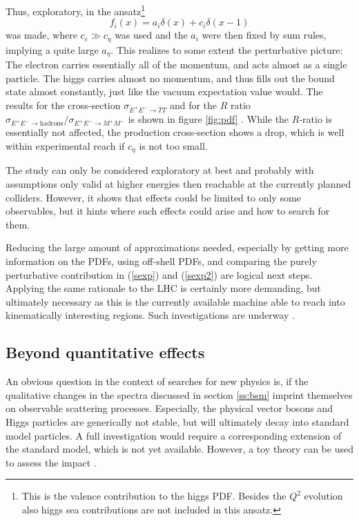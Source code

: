 \documentclass[final,12pt]{article}
\newcommand*{\no}{\noindent}
\newcommand*{\be}{\begin{equation}}
\newcommand*{\ee}{\end{equation}}
\newcommand*{\pref}[1]{(\ref{#1})}
\newcommand*{\1}{1\!\!\!\bot}
\begin{document}
Thus, exploratory, in \cite{Egger:2017tkd} the ansatz\footnote{This is the valence contribution to the higgs PDF. Besides the $Q^2$ evolution also higgs sea contributions \cite{Bauer:2017isx,Bauer:2018arx,Bauer:2018xag} are not included in this ansatz.}
\be
f_i(x)=a_i\delta(x)+c_i\delta(x-1)\label{pdfansatz}
\ee
\no was made, where $c_e\gg c_\eta$ was used and the $a_i$ were then fixed by sum rules, implying a quite large $a_\eta$. This realizes to some extent the perturbative picture: The electron carries essentially all of the momentum, and acts almost as a single particle. The higgs carries almost no momentum, and thus fills out the bound state almost constantly, just like the vacuum expectation value would. The results for the cross-section $\sigma_{E^+E^-\to\bar{T}T}$ and for the $R$ ratio $\sigma_{E^+E^-\to\text{hadrons}}/\sigma_{E^+E^-\to M^+M^-}$ is shown in figure \ref{fig:pdf} \cite{Egger:2017tkd,Maas:2017swq}. While the $R$-ratio is essentially not affected, the production cross-section shows a drop, which is well within experimental reach if $c_\eta$ is not too small.

The study can only be considered exploratory at best and probably with assumptions only valid at higher energies then reachable at the currently planned colliders. However, it shows that effects could be limited to only some observables, but it hints where such effects could arise and how to search for them.

Reducing the large amount of approximations needed, especially by getting more information on the PDFs, using off-shell PDFs, and comparing the purely perturbative contribution in \pref{sexp} and \pref{sexp2} are logical next steps. Applying the same rationale to the LHC is certainly more demanding, but ultimately necessary as this is the currently available machine able to reach into kinematically interesting regions. Such investigations are underway \cite{Maas:unpublished,Fernbach:unpublished}.

\subsection{Beyond quantitative effects}\label{ss:qscattering}

An obvious question in the context of searches for new physics is, if the qualitative changes in the spectra discussed in section \ref{ss:bsm} imprint themselves on observable scattering processes. Especially, the physical vector bosons and Higgs particles are generically not stable, but will ultimately decay into standard model particles. A full investigation would require a corresponding extension of the standard model, which is not yet available. However, a toy theory can be used to assess the impact \cite{Torek:2018qet}.
\end{document}
